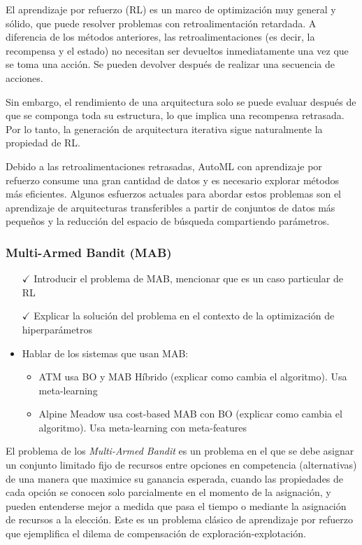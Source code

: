 El aprendizaje por refuerzo (RL) es un marco de optimización muy general y sólido, que puede resolver problemas con retroalimentación retardada. A diferencia de los métodos anteriores, las retroalimentaciones (es decir, la recompensa y el estado) no necesitan ser devueltos inmediatamente una vez que se toma una acción. Se pueden devolver después de realizar una secuencia de acciones. 

Sin embargo, el rendimiento de una arquitectura solo se puede evaluar después de que se componga toda su estructura, lo que implica una recompensa retrasada. Por lo tanto, la generación de arquitectura iterativa sigue naturalmente la propiedad de RL. 

Debido a las retroalimentaciones retrasadas, AutoML con aprendizaje por refuerzo consume una gran cantidad de datos y es necesario explorar métodos más eficientes. Algunos esfuerzos actuales para abordar estos problemas son el aprendizaje de arquitecturas transferibles a partir de conjuntos de datos más pequeños y la reducción del espacio de búsqueda compartiendo parámetros.



\subsubsection{Multi-Armed Bandit (MAB)}


\begin{itemize}
	\item[$\checkmark$] Introducir el problema de MAB, mencionar que es un caso particular de RL
	\item[$\checkmark$] Explicar la solución del problema en el contexto de la optimización de hiperparámetros
	\item Hablar de los sistemas que usan MAB:
	\begin{itemize}
		\item ATM usa BO y MAB Híbrido (explicar como cambia el algoritmo). Usa meta-learning
		\item Alpine Meadow usa cost-based MAB con BO (explicar como cambia el algoritmo). Usa meta-learning con meta-features
	\end{itemize}
\end{itemize}

El problema de los \textit{Multi-Armed Bandit} es un problema en el que se debe asignar un conjunto limitado fijo de recursos entre opciones en competencia (alternativas) de una manera que maximice su ganancia esperada, cuando las propiedades de cada opción se conocen solo parcialmente en el momento de la asignación, y pueden entenderse mejor a medida que pasa el tiempo o mediante la asignación de recursos a la elección. Este es un problema clásico de aprendizaje por refuerzo que ejemplifica el dilema de compensación de exploración-explotación.

